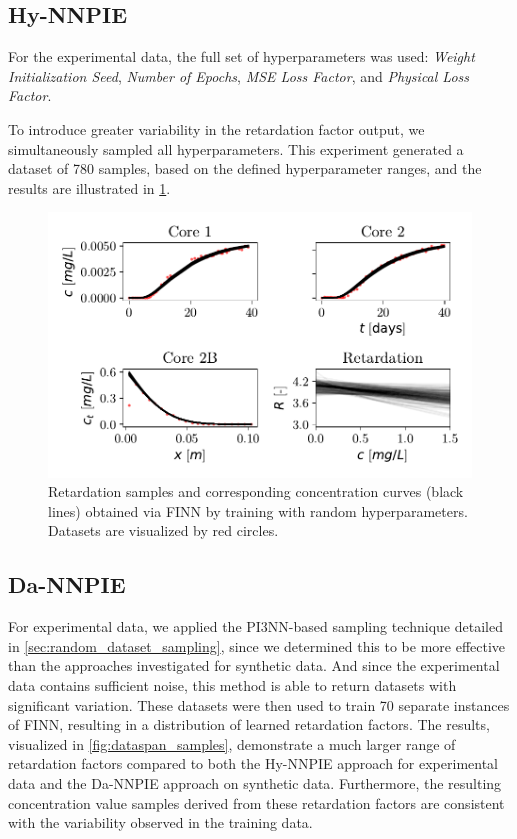 \subsection{Hy-NNPIE}
For the experimental data, the full set of hyperparameters was used: \textit{Weight Initialization Seed}, \textit{Number of Epochs}, \textit{MSE Loss Factor}, and \textit{Physical Loss Factor}.

To introduce greater variability in the retardation factor output, we simultaneously sampled all hyperparameters. This experiment generated a dataset of 780 samples, based on the defined hyperparameter ranges, and the results are illustrated in \cref{fig:span_samples}.

\begin{figure}[h]
    \centering
    \includegraphics{figs/finn_span_samples.pdf}
    \caption{Retardation samples and corresponding concentration curves (black lines) obtained via FINN by training with random hyperparameters. Datasets are visualized by red circles.}
    \label{fig:span_samples}
\end{figure}



\subsection{Da-NNPIE}
For experimental data, we applied the PI3NN-based sampling technique detailed in \cref{sec:random_dataset_sampling}, since we determined this to be more effective than the approaches investigated for synthetic data. And since the experimental data contains sufficient noise, this method is able to return datasets with significant variation.
These datasets were then used to train 70 separate instances of FINN, resulting in a distribution of learned retardation factors. The results, visualized in \cref{fig:dataspan_samples}, demonstrate a much larger range of retardation factors compared to both the Hy-NNPIE approach for experimental data and the Da-NNPIE approach on synthetic data. Furthermore, the resulting concentration value samples derived from these retardation factors are consistent with the variability observed in the training data.



